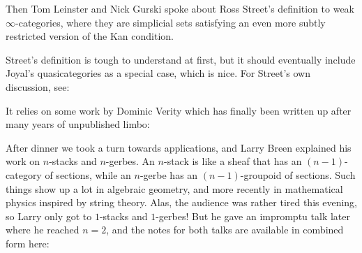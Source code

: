 \documentclass{article}
\def\tightlist{}
\renewcommand{\texttt}[1]{%
  \begingroup
  \ttfamily
  \begingroup\lccode`~=`/\lowercase{\endgroup\def~}{/\discretionary{}{}{}}%
  \begingroup\lccode`~=`[\lowercase{\endgroup\def~}{[\discretionary{}{}{}}%
  \begingroup\lccode`~=`.\lowercase{\endgroup\def~}{.\discretionary{}{}{}}%
  \catcode`/=\active\catcode`[=\active\catcode`.=\active
  \scantokens{#1\noexpand}%
  \endgroup
}
\begin{document}
Then Tom Leinster and Nick Gurski spoke about Ross Street's definition
to weak \(\infty\)-categories, where they are simplicial sets satisfying
an even more subtly restricted version of the Kan condition.


Street's definition is tough to understand at first, but it should
eventually include Joyal's quasicategories as a special case, which is
nice. For Street's own discussion, see:


It relies on some work by Dominic Verity which has finally been written
up after many years of unpublished limbo:


After dinner we took a turn towards applications, and Larry Breen
explained his work on \(n\)-stacks and \(n\)-gerbes. An \(n\)-stack is
like a sheaf that has an \((n-1)\)-category of sections, while an
\(n\)-gerbe has an \((n-1)\)-groupoid of sections. Such things show up a
lot in algebraic geometry, and more recently in mathematical physics
inspired by string theory. Alas, the audience was rather tired this
evening, so Larry only got to \(1\)-stacks and \(1\)-gerbes! But he gave
an impromptu talk later where he reached \(n = 2\), and the notes for
both talks are available in combined form here:
\end{document}
